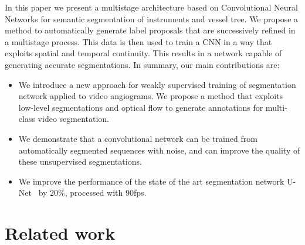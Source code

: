 \documentclass{bmvc2k}
\begin{document}
	
	In this paper we present a multistage architecture based on Convolutional Neural Networks for semantic segmentation of instruments and vessel tree. 
	We propose a method to automatically generate label proposals that are successively refined in a multistage process. This data is then used to train a CNN in a way that exploits spatial and temporal continuity. This results in a network capable of generating accurate segmentations. 
	In summary, our main contributions are: 
	\begin{itemize}
		\item We introduce a new approach for weakly supervised training of segmentation network applied to video angiograms. We propose a method that exploits low-level segmentations and optical flow to generate annotations for  multi-class video segmentation.
		\item We demonstrate that a convolutional  network can be trained from automatically segmented sequences with noise, and can improve the quality of these unsupervised segmentations. 
		\item We improve the performance of the state of the art segmentation network U-Net~\cite{unet} by 20\%, processed with 90fps.
	\end{itemize}
	
	
	\section{Related work}
\end{document}
